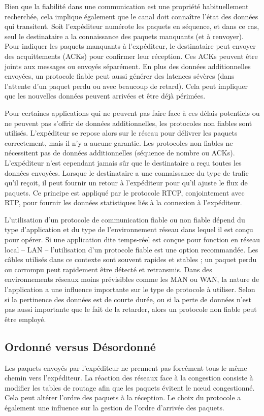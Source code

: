 Bien que la fiabilité dans une communication est une propriété habituellement 
recherchée, cela implique également que le canal doit connaître l'état des données 
qui transitent. Soit l'expéditeur numérote les paquets en séquence, et dans ce 
cas, seul le destinataire a la connaissance des paquets manquants (et à 
renvoyer). Pour indiquer les paquets manquants à l'expéditeur, le destinataire peut 
envoyer des acquittements (ACKs) pour confirmer leur réception. Ces ACKs 
peuvent être joints aux messages ou envoyés séparément. En plus des données 
additionnelles envoyées, un protocole fiable peut aussi générer des latences 
sévères (dans l'attente d'un paquet perdu ou avec beaucoup de retard). Cela peut 
impliquer que les \og nouvelles\fg{} données peuvent arrivées et être déjà 
périmées.

Pour certaines applications qui ne peuvent pas faire face à ces délais potentiels 
ou ne peuvent pas s'offrir de données additionnelles, les protocoles non fiables 
sont utilisés. 
L'expéditeur se repose alors sur le réseau pour délivrer les paquets 
correctement, mais il n'y a aucune garantie. Les protocoles non fiables ne 
nécessitent pas de données additionnelles (séquence de nombre ou ACKs). 
L'expéditeur n'est cependant jamais sûr que le destinataire a reçu toutes les 
données envoyées. Lorsque le destinataire a une connaissance du type de trafic qu'il reçoit, 
il peut fournir un retour à l'expéditeur pour qu'il ajuste le flux de paquets. Ce 
principe est appliqué par le protocole \gls{RTCP}, conjointement avec \gls{RTP}, 
pour fournir les données statistiques liés à la  connexion à l'expéditeur.

L'utilisation d'un protocole de communication fiable ou non fiable dépend du 
type d'application et du type de l'environnement réseau dans lequel il est conçu 
pour opérer. Si une application dite temps-réel est conçue pour fonction en réseau 
local -- \gls{LAN} -- l'utilisation d'un protocole fiable est une option recommandée. 
Les câbles utilisés dans ce contexte sont souvent rapides et stables ; un paquet 
perdu ou corrompu peut rapidement être détecté et retransmis. Dans des 
environnements réseaux moins prévisibles comme les \gls{MAN} ou 
\gls{WAN}, la nature de l'application a une influence importante sur le type de 
protocole à utiliser. Selon si la pertinence des données est de courte durée, ou si 
la perte de données n'est pas aussi importante que le fait de la retarder, alors un 
protocole non fiable peut être employé.


\subsection{Ordonné versus Désordonné}
\label{sec:ordre}
Les paquets envoyés par l'expéditeur ne prennent pas forcément tous le même 
chemin vers l'expéditeur. La réaction des réseaux face à la congestion consiste à 
modifier les tables de routage afin que les paquets évitent le n\oe ud congestionné. 
Cela peut altérer l'ordre des paquets à la réception. Le choix du protocole a 
également une influence sur la gestion de l'ordre d'arrivée des paquets.


